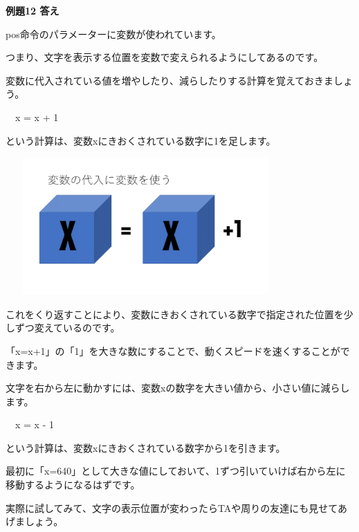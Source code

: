 \documentclass[a4paper,12pt]{jarticle}
\begin{document}
\bigskip

\bigskip

{\bfseries
例題12 答え}

\bigskip

pos命令のパラメーターに変数が使われています。

つまり、文字を表示する位置を変数で変えられるようにしてあるのです。

変数に代入されている値を増やしたり、減らしたりする計算を覚えておきましょう。


\bigskip

\ \ x = x + 1

\bigskip

という計算は、変数xにきおくされている数字に1を足します。

\bigskip
\bigskip

\begin{minipage}{9.781cm}
\centering
{\upshape
\includegraphics[keepaspectratio,width=10.689cm,height=5.265cm]{text02-img/text02-img051.png}}
\end{minipage}

\bigskip
\bigskip
\bigskip

これをくり返すことにより、変数にきおくされている数字で指定された位置を少しずつ変えているのです。

「x=x+1」の「1」を大きな数にすることで、動くスピードを速くすることができます。

文字を右から左に動かすには、変数xの数字を大きい値から、小さい値に減らします。

\bigskip

\ \ x = x - 1

\bigskip

という計算は、変数xにきおくされている数字から1を引きます。

最初に「x=640」として大きな値にしておいて、1ずつ引いていけば右から左に移動するようになるはずです。

実際に試してみて、文字の表示位置が変わったらTAや周りの友達にも見せてあげましょう。
\end{document}

